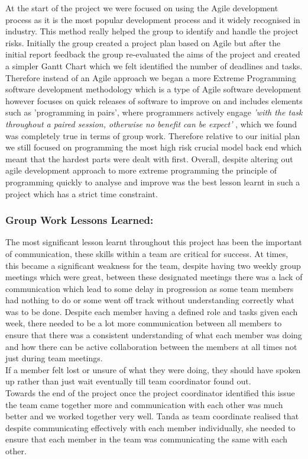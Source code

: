 \documentclass[11pt]{article}
\begin{document}
At the start of the project we were focused on using the Agile development process as it is the most popular development process and it widely recognised in industry. This method really helped the group to identify and handle the project risks. Initially the group created a project plan based on Agile but after the initial report feedback the group re-evaluated the aims of the project and created a simpler Gantt Chart which we felt identified the number of deadlines and tasks. Therefore instead of an Agile approach we began a more Extreme Programming software development methodology which is a type of Agile software development however focuses on quick releases of software to improve on and includes elements such as 'programming in pairs', where programmers actively engage \textit{'with the task throughout a paired session, otherwise no benefit can be expect'} \cite{Risk}, which we found was completely true in terms of group work. Therefore relative to our initial plan we still focused on programming the most high risk crucial model back end which meant that the hardest parts were dealt with first. Overall, despite altering out agile development approach to more extreme programming the principle of programming quickly to analyse and improve was the best lesson learnt in such a project which has a strict time constraint. 

\subsubsection{Group Work Lessons Learned:} %
The most significant lesson learnt throughout this project has been the important of communication, these skills within a team are critical for success. At times, this became a significant weakness for the team, despite having two weekly group meetings which were great, between these designated meetings there was a lack of communication which lead to some delay in progression as some team members had nothing to do or some went off track without understanding correctly what was to be done. Despite each member having a defined role and tasks given each week, there needed to be a lot more communication between all members to ensure that there was a consistent understanding of what each member was doing and how there can be active collaboration between the members at all times not just during team meetings. \\ If a member felt lost or unsure of what they were doing, they should have spoken up rather than just wait eventually till team coordinator found out. 
\\ Towards the end of the project once the project coordinator identified this issue the team came together more and communication with each other was much better and we worked together very well. Tanda as team coordinate realised that despite communicating effectively with each member individually, she needed to ensure that each member in the team was communicating the same with each other. \\
\end{document}
